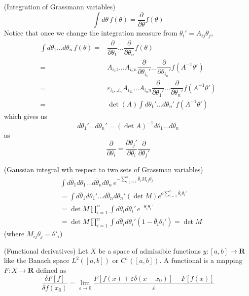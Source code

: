 \begin{defi}
(Integration of Grassmann variables) 
	\[\int d\theta \,f(\theta )=\dfrac{\partial }{\partial \theta }f(\theta ) \]
Notice that once we change the integration measure from $\theta _{i}'=A_{ij}\theta _{j}$,
\[\begin{align*}
	\int d\theta _{1}\ldots d\theta _{n}\,f(\theta )=&\dfrac{\partial }{\partial \theta_1}\ldots \dfrac{\partial }{\partial \theta _{n}}f(\theta )  \\
	=&A_{i_{1}1}\ldots A_{i_{n}n}\dfrac{\partial }{\partial \theta _{i_1}'}\ldots \dfrac{\partial }{\partial \theta _{i_{n}}'}f(A^{-1}\theta ') \\
	=&\varepsilon _{i_{1}\ldots i_{n}}A_{i_11}\ldots A_{i_{n}n}\dfrac{\partial }{\partial \theta _{1}'}\ldots \dfrac{\partial }{\partial \theta _{n}'}f(A^{-1}\theta ')\\
	=&\mathop{\mathrm{det}}(A)\int d\theta _{1}'\ldots d\theta _{n}'\,f(A^{-1}\theta ')
\end{align*}\]
which gives us
\[d\theta_1'\ldots d\theta _{n}'=(\mathrm{\mathop{det}}A)^{-1}d\theta _{1}\ldots d\theta _{n}\]
as
\[\dfrac{\partial }{\partial \theta _{i}}=\dfrac{\partial \theta _{j}'}{\partial \theta _{i}}\dfrac{\partial }{\partial \theta _{j}'}   \]
\end{defi}
\vspace{2ex}
\begin{defi}
(Gaussian integral wth respect to two sets of Grassman variables)
\[\begin{align*}
	&\int d\bar{\theta }_{1}d\theta _{1}\ldots d\bar{\theta }_{n}d\theta _{n}\,e^{-\sum _{i,j=1}^{n}\bar{\theta }_{i}M_{ij}\theta _{j}}\\
	&=\int d\bar{\theta}_{1}d\theta _{1}'\ldots d\bar{\theta }_{n}d\theta _{n}'(\mathop{\mathrm{det}}M)e^{o\sum ^{n}_{i=1}\bar{\theta }_{i}\theta _{i}'}\\
	&=\mathop{\mathrm{det}}M\prod_{i=1}^{n}\int d\bar{\theta }_{i}d\theta _{i}'\,e^{-\bar{\theta }_{i}\theta _{i}'}\\
	&=\mathop{\mathrm{det}}M\prod^{n}_{i=1}\int d\bar{\theta }_{i}d\theta _{i}'(1-\bar{\theta}_{i}\theta _{i}')=\mathop{\mathrm{det}}M
\end{align*}\]
(where $M_{ij}\theta _{j}=\theta '_{i}$)
\end{defi}
\vspace{2ex}
\begin{defi}
(Functional derivatives) Let $X$ be a space of admissible functions $y:[a,b]\rightarrow {\bm R}$ like the Banach space $L^2([a,b])$ or $C^{1}([a,b])$. A functional is a mapping $F:X\rightarrow {\bm R}$ defined as
\[\dfrac{\delta F[f]}{\delta f(x_0)}=\lim _{\varepsilon \rightarrow 0}\dfrac{F[f(x)+\varepsilon \delta(x-x_0) ]-F[f(x)]}{\varepsilon }\]
\end{defi}
